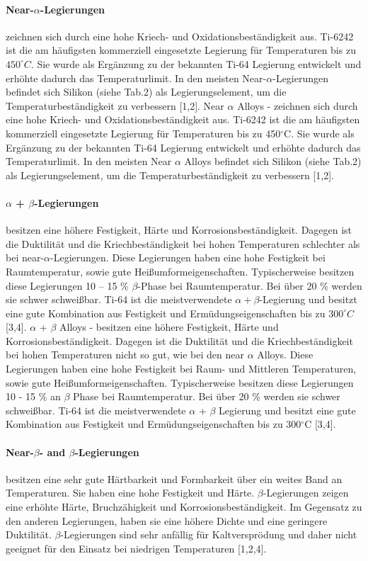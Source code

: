 \paragraph{Near-$\alpha$-Legierungen}
zeichnen sich durch eine hohe Kriech- und Oxidationsbeständigkeit aus. Ti-6242 ist die am häufigsten kommerziell eingesetzte Legierung für Temperaturen bis zu $450 ^\circ C$.
Sie wurde als Ergänzung zu der bekannten Ti-64 Legierung entwickelt und erhöhte dadurch das Temperaturlimit. In den meisten Near-$\alpha$-Legierungen befindet sich Silikon (siehe Tab.2) als Legierungselement, um die Temperaturbeständigkeit zu verbessern [1,2].
Near $\alpha$ Alloys - zeichnen sich durch eine hohe Kriech- und Oxidationsbeständigkeit aus. Ti-6242 ist die am häufigsten kommerziell eingesetzte Legierung für Temperaturen bis zu 450$^\circ$C.
Sie wurde als Ergänzung zu der bekannten Ti-64 Legierung entwickelt und erhöhte dadurch das Temperaturlimit. In den meisten Near $\alpha$ Alloys befindet sich Silikon (siehe Tab.2) als Legierungselement, um die Temperaturbeständigkeit zu verbessern [1,2].

\paragraph{$\alpha$ + $\beta$-Legierungen} besitzen eine höhere Festigkeit, Härte und Korrosionsbeständigkeit. Dagegen ist die Duktilität und die Kriechbeständigkeit bei hohen Temperaturen schlechter als bei near-$\alpha$-Legierungen. Diese Legierungen haben eine hohe Festigkeit bei Raumtemperatur, sowie gute Heißumformeigenschaften. Typischerweise besitzen diese Legierungen 10 -- 15 \% $\beta$-Phase bei Raumtemperatur. Bei über 20 \% werden sie schwer schweißbar. Ti-64 ist die meistverwendete $\alpha+\beta$-Legierung und besitzt eine gute Kombination aus Festigkeit und Ermüdungseigenschaften bis zu $300 ^\circ C$ [3,4].
$\alpha$ + $\beta$ Alloys - besitzen eine höhere Festigkeit, Härte und Korrosionsbeständigkeit. Dagegen ist die Duktilität und die Kriechbeständigkeit bei hohen Temperaturen nicht so gut, wie bei den near $\alpha$ Alloys. Diese Legierungen haben eine hohe Festigkeit bei Raum- und Mittleren Temperaturen, sowie gute Heißumformeigenschaften. Typischerweise besitzen diese Legierungen 10 - 15 \% an $\beta$ Phase bei Raumtemperatur. Bei über 20 \% werden sie schwer schweißbar. Ti-64 ist die meistverwendete $\alpha$ + $\beta$ Legierung und besitzt eine gute Kombination aus Festigkeit und Ermüdungseigenschaften bis zu 300$^\circ$C [3,4].

\paragraph{Near-$\beta$- and $\beta$-Legierungen} besitzen eine sehr gute Härtbarkeit und Formbarkeit über ein weites Band an Temperaturen. Sie haben eine hohe Festigkeit und Härte.
$\beta$-Legierungen zeigen eine erhöhte Härte, Bruchzähigkeit und Korrosionsbeständigkeit.
Im Gegensatz zu den anderen Legierungen, haben sie eine höhere Dichte und eine geringere Duktilität. $\beta$-Legierungen sind sehr anfällig für Kaltversprödung und daher nicht geeignet für den Einsatz bei niedrigen Temperaturen [1,2,4].

